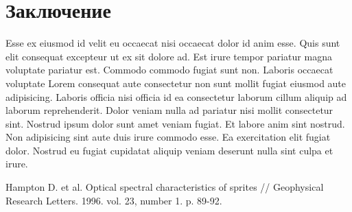 \documentclass[12pt,a4paper]{report}
\begin{document}
\chapter*{Заключение}

Esse ex eiusmod id velit eu occaecat nisi occaecat dolor id anim esse. Quis sunt elit consequat excepteur ut ex sit dolore ad. Est irure tempor pariatur magna voluptate pariatur est. Commodo commodo fugiat sunt non. Laboris occaecat voluptate Lorem consequat aute consectetur non sunt mollit fugiat eiusmod aute adipisicing. Laboris officia nisi officia id ea consectetur laborum cillum aliquip ad laborum reprehenderit. Dolor veniam nulla ad pariatur nisi mollit consectetur sint. Nostrud ipsum dolor sunt amet veniam fugiat. Et labore anim sint nostrud. Non adipisicing sint aute duis irure commodo esse. Ea exercitation elit fugiat dolor. Nostrud eu fugiat cupidatat aliquip veniam deserunt nulla sint culpa et irure.

\renewcommand\bibname{Cписок использованных источников}

\begin{thebibliography}{99}
     Hampton D. et al. Optical spectral characteristics of sprites // Geophysical Research Letters. 1996. vol. 23, number 1. p. 89-92.
\end{thebibliography}
\end{document}
